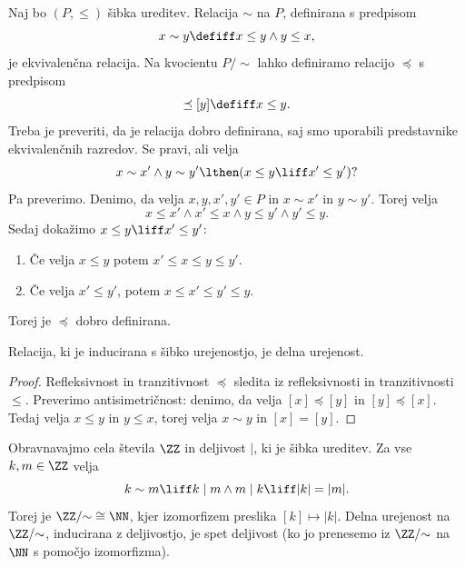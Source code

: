 Naj bo $(P, \leq)$ šibka ureditev. Relacija $\sim$ na $P$, definirana s predpisom
%
\begin{equation*}
  x \sim y \defiff x \leq y \land y \leq x,
\end{equation*}
%
je ekvivalenčna relacija. Na kvocientu $P/{\sim}$ lahko definiramo relacijo $\preceq$ s
predpisom
%
\begin{equation*}
  [x] \preceq [y] \defiff x \leq y.
\end{equation*}
%
Treba je preveriti, da je relacija dobro definirana, saj smo uporabili predstavnike ekvivalenčnih razredov. Se pravi, ali velja
\begin{equation*}
  x \sim x' \land y \sim y' \lthen (x \leq y \liff x' \leq y') ?
\end{equation*}
%
Pa preverimo. Denimo, da velja $x, y, x', y' \in P$ in $x \sim x'$ in $y \sim y'$.
Torej velja
\begin{equation*}
  x \leq x' \land x' \leq x \land y \leq y' \land y' \leq y.
\end{equation*}
%
Sedaj dokažimo $x \leq y \liff x' \leq y'$:
%
\begin{enumerate}
\item Če velja $x \leq y$ potem $x' \leq x \leq y \leq y'$.
\item Če velja $x' \leq y'$, potem $x \leq x' \leq y' \leq y$.
\end{enumerate}
%
Torej je $\preceq$ dobro definirana.

\begin{izjava}
  Relacija, ki je inducirana s šibko urejenostjo, je delna urejenost.
\end{izjava}

\begin{proof}
  Refleksivnost in tranzitivnost $\preceq$ sledita iz refleksivnosti in tranzitivnosti~$\leq$. Preverimo antisimetričnost: denimo, da velja $[x] \preceq [y]$ in $[y] \preceq [x]$. Tedaj velja $x \leq y$ in $y \leq x$, torej velja $x \sim y$ in $[x] = [y]$.
\end{proof}

\begin{zgled}
  Obravnavajmo cela števila $\ZZ$ in deljivost $\mid$, ki je šibka
  ureditev. Za vse $k, m \in \ZZ$ velja
  \begin{equation*}
    k \sim m \liff k \mid m \land m \mid k \liff |k| = |m|.
  \end{equation*}
  Torej je $\ZZ/{\sim} \cong \NN$, kjer izomorfizem preslika $[k] \mapsto |k|$. Delna urejenost na $\ZZ/{\sim}$, inducirana z deljivostjo, je spet deljivost (ko jo prenesemo iz $\ZZ/{\sim}$ na $\NN$ s pomočjo izomorfizma).
\end{zgled}


